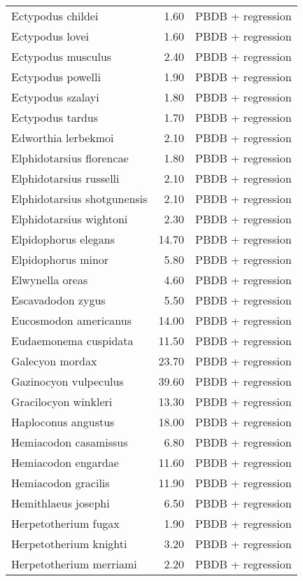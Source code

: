 \begin{table}[ht]
\begin{tabular}{lrl}
  Ectypodus childei & 1.60 & PBDB + regression \\ 
  Ectypodus lovei & 1.60 & PBDB + regression \\ 
  Ectypodus musculus & 2.40 & PBDB + regression \\ 
  Ectypodus powelli & 1.90 & PBDB + regression \\ 
  Ectypodus szalayi & 1.80 & PBDB + regression \\ 
  Ectypodus tardus & 1.70 & PBDB + regression \\ 
  Edworthia lerbekmoi & 2.10 & PBDB + regression \\ 
  Elphidotarsius florencae & 1.80 & PBDB + regression \\ 
  Elphidotarsius russelli & 2.10 & PBDB + regression \\ 
  Elphidotarsius shotgunensis & 2.10 & PBDB + regression \\ 
  Elphidotarsius wightoni & 2.30 & PBDB + regression \\ 
  Elpidophorus elegans & 14.70 & PBDB + regression \\ 
  Elpidophorus minor & 5.80 & PBDB + regression \\ 
  Elwynella oreas & 4.60 & PBDB + regression \\ 
  Escavadodon zygus & 5.50 & PBDB + regression \\ 
  Eucosmodon americanus & 14.00 & PBDB + regression \\ 
  Eudaemonema cuspidata & 11.50 & PBDB + regression \\ 
  Galecyon mordax & 23.70 & PBDB + regression \\ 
  Gazinocyon vulpeculus & 39.60 & PBDB + regression \\ 
  Gracilocyon winkleri & 13.30 & PBDB + regression \\ 
  Haploconus angustus & 18.00 & PBDB + regression \\ 
  Hemiacodon casamissus & 6.80 & PBDB + regression \\ 
  Hemiacodon engardae & 11.60 & PBDB + regression \\ 
  Hemiacodon gracilis & 11.90 & PBDB + regression \\ 
  Hemithlaeus josephi & 6.50 & PBDB + regression \\ 
  Herpetotherium fugax & 1.90 & PBDB + regression \\ 
  Herpetotherium knighti & 3.20 & PBDB + regression \\ 
  Herpetotherium merriami & 2.20 & PBDB + regression \\ 

\end{tabular}
\end{table}
